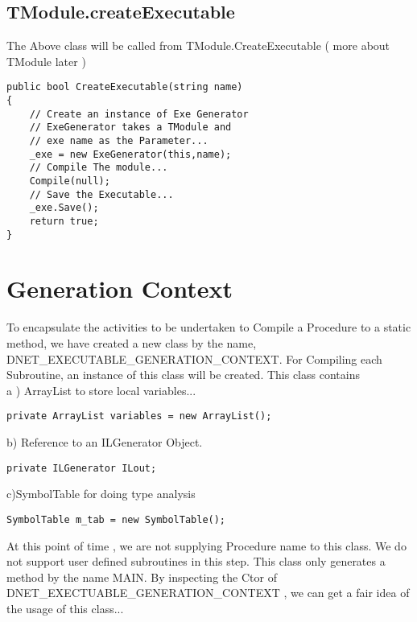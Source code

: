 \subsection{TModule.createExecutable}
The Above class will be called from TModule.CreateExecutable ( more about TModule later )
\lstset{style=csharp}
\begin{lstlisting}
public bool CreateExecutable(string name)
{
	// Create an instance of Exe Generator
	// ExeGenerator takes a TModule and
	// exe name as the Parameter...
	_exe = new ExeGenerator(this,name);
	// Compile The module...
	Compile(null);
	// Save the Executable...
	_exe.Save();
	return true;
}
\end{lstlisting}
\section{Generation Context}
To encapsulate the activities to be undertaken to Compile a Procedure to a static method, we have created a new class by the name, DNET\_EXECUTABLE\_GENERATION\_CONTEXT. For Compiling each Subroutine, an instance of this class will be created. This class contains\\
a ) ArrayList to store local variables...
\lstset{style=csharp}
\begin{lstlisting}
private ArrayList variables = new ArrayList();
\end{lstlisting}

b) Reference to an ILGenerator Object.
\lstset{style=csharp}
\begin{lstlisting}
private ILGenerator ILout;
\end{lstlisting}

c)SymbolTable for doing type analysis
\lstset{style=csharp}
\begin{lstlisting}
SymbolTable m_tab = new SymbolTable();
\end{lstlisting}
At this point of time , we are not supplying Procedure name to this class. We do not support user defined subroutines in this
step. This class only generates a method by the name MAIN.
By inspecting the Ctor of DNET\_EXECTUABLE\_GENERATION\_CONTEXT , we can get a fair idea of the usage of this
class...

